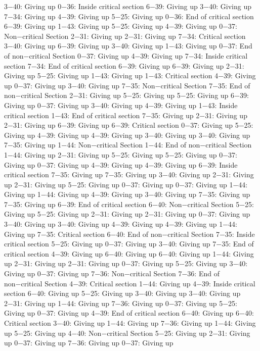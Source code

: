 3−40: Giving up
0−36: Inside critical section
6−39: Giving up
3−40: Giving up
7−34: Giving up
4−39: Giving up
5−25: Giving up
0−36: End of critical section
6−39: Giving up
1−43: Giving up
5−25: Giving up
4−39: Giving up
0−37: Non−critical Section
2−31: Giving up
2−31: Giving up
7−34: Critical section
3−40: Giving up
6−39: Giving up
3−40: Giving up
1−43: Giving up
0−37: End of non−critical Section
0−37: Giving up
4−39: Giving up
7−34: Inside critical section
7−34: End of critical section
6−39: Giving up
6−39: Giving up
2−31: Giving up
5−25: Giving up
1−43: Giving up
1−43: Critical section
4−39: Giving up
0−37: Giving up
3−40: Giving up
7−35: Non−critical Section
7−35: End of non−critical Section
2−31: Giving up
5−25: Giving up
5−25: Giving up
6−39: Giving up
0−37: Giving up
3−40: Giving up
4−39: Giving up
1−43: Inside critical section
1−43: End of critical section
7−35: Giving up
2−31: Giving up
2−31: Giving up
6−39: Giving up
6−39: Critical section
0−37: Giving up
5−25: Giving up
4−39: Giving up
4−39: Giving up
3−40: Giving up
3−40: Giving up
7−35: Giving up
1−44: Non−critical Section
1−44: End of non−critical Section
1−44: Giving up
2−31: Giving up
5−25: Giving up
5−25: Giving up
0−37: Giving up
0−37: Giving up
4−39: Giving up
4−39: Giving up
6−39: Inside critical section
7−35: Giving up
7−35: Giving up
3−40: Giving up
2−31: Giving up
2−31: Giving up
5−25: Giving up
0−37: Giving up
0−37: Giving up
1−44: Giving up
1−44: Giving up
4−39: Giving up
3−40: Giving up
7−35: Giving up
7−35: Giving up
6−39: End of critical section
6−40: Non−critical Section
5−25: Giving up
5−25: Giving up
2−31: Giving up
2−31: Giving up
0−37: Giving up
3−40: Giving up
3−40: Giving up
4−39: Giving up
4−39: Giving up
1−44: Giving up
7−35: Critical section
6−40: End of non−critical Section
7−35: Inside critical section
5−25: Giving up
0−37: Giving up
3−40: Giving up
7−35: End of critical section
4−39: Giving up
6−40: Giving up
6−40: Giving up
1−44: Giving up
2−31: Giving up
2−31: Giving up
0−37: Giving up
5−25: Giving up
3−40: Giving up
0−37: Giving up
7−36: Non−critical Section
7−36: End of non−critical Section
4−39: Critical section
1−44: Giving up
4−39: Inside critical section
6−40: Giving up
5−25: Giving up
3−40: Giving up
3−40: Giving up
2−31: Giving up
1−44: Giving up
7−36: Giving up
0−37: Giving up
5−25: Giving up
0−37: Giving up
4−39: End of critical section
6−40: Giving up
6−40: Critical section
3−40: Giving up
1−44: Giving up
7−36: Giving up
1−44: Giving up
5−25: Giving up
4−40: Non−critical Section
5−25: Giving up
2−31: Giving up
0−37: Giving up
7−36: Giving up
0−37: Giving up
